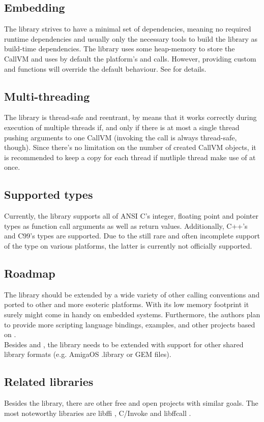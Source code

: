 \subsection{Embedding}

The  library strives to have a minimal set of dependencies,
meaning no required runtime dependencies and usually only the necessary tools
to build the library as build-time dependencies.
The library uses some heap-memory to store the CallVM and uses by default the
platform's  and  calls. However, providing custom
 and  functions will override the default
behaviour.
See  for details.


\subsection{Multi-threading}

The  library is thread-safe and reentrant, by means that it
works correctly during execution of multiple threads if, and only if there is
at most a single thread pushing arguments to one CallVM (invoking the call is
always thread-safe, though). Since there's no limitation on the number of
created CallVM objects, it is recommended to keep a copy for each thread if
mutliple thread make use of  at once.


\subsection{Supported types}

Currently, the  library supports all of ANSI C's integer,
floating point and pointer types as function call arguments as well as return
values. Additionally, C++'s  and C99's  types are supported.
Due to the still rare and often incomplete support of the  type
on various platforms, the latter is currently not officially supported.


\subsection{Roadmap}

The  library should be extended by a wide variety of other
calling conventions and ported to other and more esoteric platforms. With its low
memory footprint it surely might come in handy on embedded systems.
Furthermore, the authors plan to provide more scripting language bindings,
examples, and other projects based on .\\
Besides  and , the 
library needs to be extended with support for other shared library formats
(e.g. AmigaOS .library or GEM \cite{.ldg} files).


\subsection{Related libraries}

Besides the  library, there are other free and open projects
with similar goals. The most noteworthy libraries are libffi \cite{libffi},
C/Invoke \cite{cinvoke} and libffcall \cite{libffcall}.

